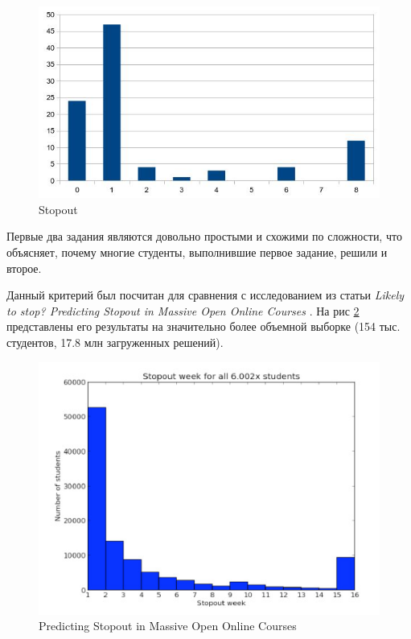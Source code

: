 \documentclass[a4paper,12pt]{article}
\begin{document}
\begin{figure}[h]
 	\centering
	\includegraphics[width=\textwidth]{stopout.jpg}
	\caption{Stopout}
	\label{fig:mesh2}
\end{figure}

Первые два задания являются довольно простыми и схожими по сложности, что объясняет, почему многие студенты, выполнившие первое задание, решили и второе.

Данный критерий был посчитан для сравнения с исследованием из статьи \textit{Likely to stop? Predicting Stopout in Massive Open Online Courses} \cite{likelytostop}. На рис \ref{fig:mesh3} представлены его результаты на значительно более объемной выборке (154 тыс. студентов, 17.8 млн загруженных решений).

\begin{figure}[h]
	\centering
	\includegraphics[width=\textwidth]{stopout_mit.jpg}
	\caption{Predicting Stopout in Massive Open Online Courses}
	\label{fig:mesh3}
\end{figure}
\pagebreak
\end{document}
